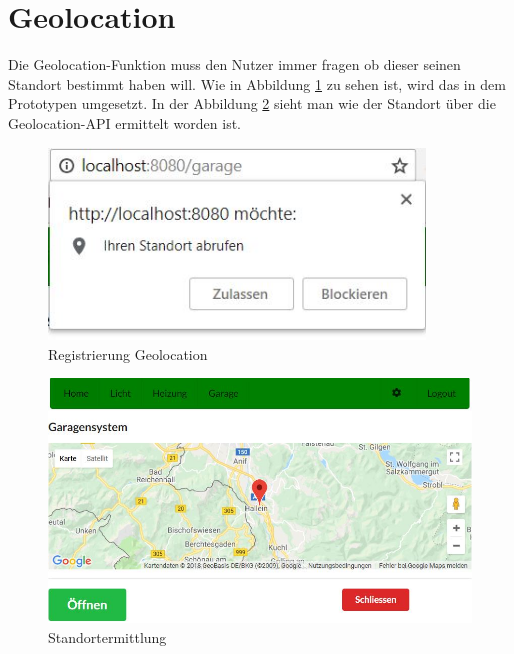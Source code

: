 \section{Geolocation}
Die Geolocation-Funktion muss den Nutzer immer fragen ob dieser seinen Standort bestimmt haben will. Wie in Abbildung \ref{fig:Registrierung} zu sehen ist, wird das in dem Prototypen umgesetzt. In der Abbildung \ref{fig:Maps} sieht man wie der Standort über die Geolocation-API ermittelt worden ist.

\begin{figure}[h]
	\centering
	\includegraphics[width=10cm]{BilderAllgemein/Geolocation/Registrierung}\medskip
	\caption{Registrierung Geolocation}
	\label{fig:Registrierung}
\end{figure}

\begin{figure}[h]
	\centering
	\includegraphics[width=14cm]{BilderAllgemein/Geolocation/Maps}\medskip
	\caption{Standortermittlung}
	\label{fig:Maps}
\end{figure}

\newpage
